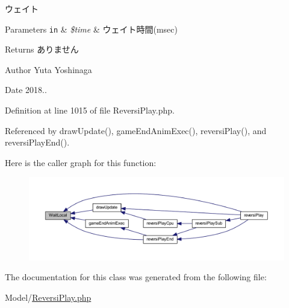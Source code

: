 ウェイト 


\begin{DoxyParams}[1]{Parameters}
\mbox{\tt in}  & {\em \$time} & ウェイト時間(msec) \\
\hline
\end{DoxyParams}
\begin{DoxyReturn}{Returns}
ありません 
\end{DoxyReturn}
\begin{DoxyAuthor}{Author}
Yuta Yoshinaga 
\end{DoxyAuthor}
\begin{DoxyDate}{Date}
2018.. 
\end{DoxyDate}


Definition at line 1015 of file Reversi\+Play.\+php.



Referenced by draw\+Update(), game\+End\+Anim\+Exec(), reversi\+Play(), and reversi\+Play\+End().

Here is the caller graph for this function\+:\nopagebreak
\begin{figure}[H]
\begin{center}
\leavevmode
\includegraphics[width=350pt]{class_reversi_play_a58884d8de55d9faeac653fcf6d4f48b3_icgraph}
\end{center}
\end{figure}


The documentation for this class was generated from the following file\+:\begin{DoxyCompactItemize}
\item 
Model/\hyperlink{_reversi_play_8php}{Reversi\+Play.\+php}\end{DoxyCompactItemize}
